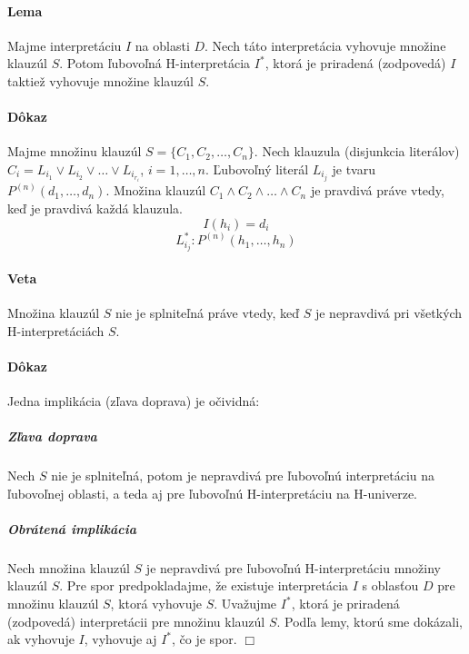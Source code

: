 \paragraph{Lema} Majme interpretáciu $I$ na oblasti $D$. Nech táto interpretácia
vyhovuje množine klauzúl $S$. Potom ľubovoľná H-interpretácia $I^*$, ktorá je
priradená (zodpovedá) $I$ taktiež vyhovuje množine klauzúl $S$.

\paragraph{Dôkaz} Majme množinu klauzúl $S=\{C_1, C_2, \ldots , C_n\}$. Nech
klauzula (disjunkcia literálov) $C_i = L_{i_1} \lor L_{i_2} \lor \ldots \lor
L_{i_{r_i}}$, $i=1,\ldots,n$. Ľubovoľný literál $L_{i_j}$ je tvaru $P^{(n)}(d_1,
\ldots, d_n)$. Množina klauzúl $C_1 \land C_2 \land \ldots \land C_n$ je
pravdivá práve vtedy, keď je pravdivá každá klauzula.
$$I(h_i) = d_i$$
$$L^*_{i_j}: P^{(n)}(h_1, \ldots, h_n)$$

\paragraph{Veta} Množina klauzúl $S$ nie je splniteľná práve vtedy, keď $S$ je
nepravdivá pri všetkých H-interpretáciách $S$. 

\paragraph{Dôkaz} Jedna implikácia (zľava doprava) je očividná:

\subparagraph{Zľava doprava} Nech $S$ nie je splniteľná, potom je nepravdivá pre ľubovoľnú interpretáciu
na ľubovoľnej oblasti, a teda aj pre ľubovoľnú H-interpretáciu na H-univerze.

\subparagraph{Obrátená implikácia} Nech množina klauzúl $S$ je nepravdivá pre
ľubovoľnú H-interpretáciu množiny klauzúl $S$. Pre spor predpokladajme, že
existuje interpretácia $I$ s oblasťou $D$ pre množinu klauzúl $S$, ktorá
vyhovuje $S$. Uvažujme $I^*$, ktorá je priradená (zodpovedá) interpretácii pre
množinu klauzúl $S$. Podľa lemy, ktorú sme dokázali, ak vyhovuje $I$, vyhovuje
aj $I^*$, čo je spor. $\Box$

